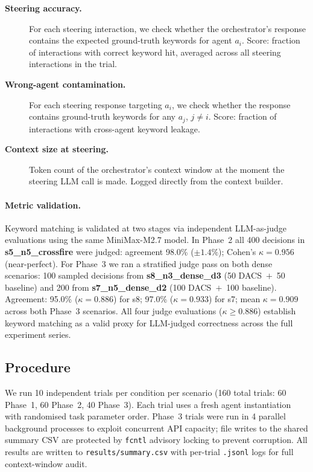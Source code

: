 \documentclass{article}
\begin{document}
\begin{description}
  \item[\textbf{Steering accuracy.}]
  For each steering interaction, we check whether the orchestrator's
  response contains the expected ground-truth keywords for agent $a_i$.
  Score: fraction of interactions with correct keyword hit, averaged
  across all steering interactions in the trial.

  \item[\textbf{Wrong-agent contamination.}]
  For each steering response targeting $a_i$, we check whether the
  response contains ground-truth keywords for any $a_j$, $j \neq i$.
  Score: fraction of interactions with cross-agent keyword leakage.

  \item[\textbf{Context size at steering.}]
  Token count of the orchestrator's context window at the moment the
  steering LLM call is made.
  Logged directly from the context builder.
\end{description}

\paragraph{Metric validation.}
Keyword matching is validated at two stages via independent LLM-as-judge
evaluations using the same MiniMax-M2.7 model.
In Phase~2 all 400 decisions in \textbf{s5\_n5\_crossfire} were judged:
agreement 98.0\% ($\pm 1.4\%$); Cohen's $\kappa = 0.956$ (near-perfect).
For Phase~3 we ran a stratified judge pass on both dense scenarios:
100 sampled decisions from \textbf{s8\_n3\_dense\_d3} (50 DACS~$+$~50 baseline)
and 200 from \textbf{s7\_n5\_dense\_d2} (100 DACS~$+$~100 baseline).
Agreement: 95.0\% ($\kappa=0.886$) for s8; 97.0\% ($\kappa=0.933$) for s7;
mean $\kappa=0.909$ across both Phase~3 scenarios.
All four judge evaluations ($\kappa \geq 0.886$) establish keyword matching
as a valid proxy for LLM-judged correctness across the full experiment series.

\subsection{Procedure}
\label{sec:procedure}

We run 10 independent trials per condition per scenario (160 total trials:
60 Phase~1, 60 Phase~2, 40 Phase~3).
Each trial uses a fresh agent instantiation with randomised task parameter
order. Phase~3 trials were run in 4 parallel background processes to
exploit concurrent API capacity; file writes to the shared summary CSV
are protected by \texttt{fcntl} advisory locking to prevent corruption.
All results are written to \texttt{results/summary.csv} with per-trial
\texttt{.jsonl} logs for full context-window audit.
\end{document}
